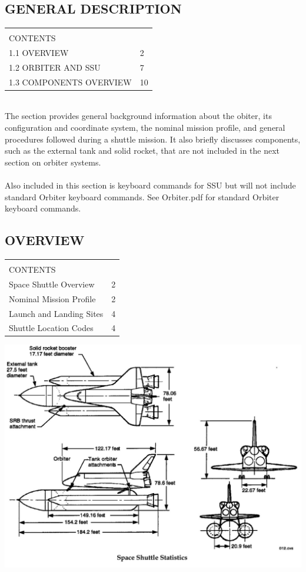 \documentclass[13pt, letter,final]{article}
\begin{document}
\begin{multicols}{2}
\section{\large GENERAL DESCRIPTION}

\begin{tabular}{|p{6.9cm}  p{0.25cm}|}
	\hline
	&\\[0.1cm]
	CONTENTS & \\[0.4cm]
	1.1	OVERVIEW & 2\\
	1.2	ORBITER AND SSU & 7\\
	1.3	COMPONENTS OVERVIEW & 10\\
	\hline
\end{tabular}
\\[0.4cm]
The section provides general background information about the obiter, its configuration and coordinate system, the nominal mission profile, and general procedures followed during a shuttle mission. It also briefly discusses components, such as the external tank and solid rocket, that are not included in the next section on orbiter systems.\\
\\
Also included in this section is keyboard commands for SSU but will not include standard Orbiter keyboard commands. See Orbiter.pdf for standard Orbiter keyboard commands.
\newpage

\subsection{\large OVERVIEW}

\begin{tabular}{|p{6.9cm} p{0.25cm}|}
	\hline
	&\\[0.1cm]
	CONTENTS & \\[0.4cm]
	Space Shuttle Overview & 2\\
	Nominal Mission Profile & 2\\
	Launch and Landing Sites & 4 \\
	Shuttle Location Codes &  4\\
	\hline
\end{tabular}

\end{multicols}
\includegraphics[width=1\textwidth]{Space Shuttle Stats.jpg}
\end{document}
